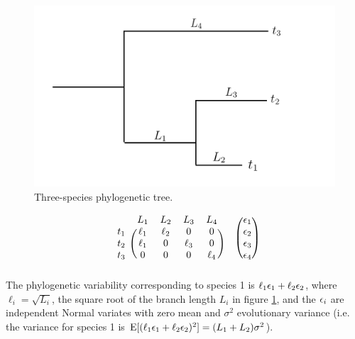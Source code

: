 \documentclass[12pt]{article}
\begin{document}
\begin{center}
\begin{figure}[H]
  \includegraphics[scale=0.8,page=1]{./figure/phylotree.png}
  \caption{Three-species phylogenetic tree.}
\label{fig:tree}
\end{figure}
\end{center}
\[
  \begin{blockarray}{ccccc}
  & L_1 & L_2 & L_3 & L_4  \\
  \begin{block}{c(cccc)}
  t_1 & \ell_1 & \ell_2 & 0           & 0 \\
  t_2 & \ell_1 &  0          & \ell_3 & 0 \\
  t_3 & 0           &  0          & 0           & \ell_4 \\
  \end{block}
  \end{blockarray}
  \hspace{0.5cm}
  \begin{blockarray}{(c)}
  \e_1 \\
  \e_2 \\
  \e_3 \\
  \e_4 \\
  \end{blockarray}
  \]
The phylogenetic variability corresponding to species 1 is $\ell_1 { \epsilon}_1 + \ell_2 { \epsilon}_2$, where $\ell_i = \sqrt{L_i}$, the square root of the branch length $L_i$ in figure \ref{fig:tree}, and the ${ \epsilon}_i$ are independent Normal variates with zero mean and $\sigma^2$ evolutionary variance (i.e. the variance for species 1 is $\textrm{E}[(\ell_1 { \epsilon}_1 + \ell_2 { \epsilon}_2)^2] = (L_1 + L_2)\sigma^2$).
\end{document}
